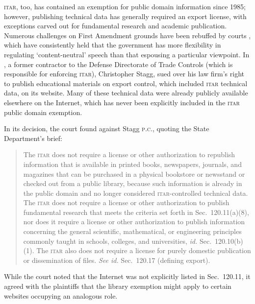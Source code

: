 \documentclass[12pt]{olfmemo}
\begin{document}
\textsc{itar}, too, has contained an exemption for public domain information since 1985; however, publishing technical data has generally required an export license, with exceptions carved out for fundamental research and academic publication. Numerous challenges on First Amendment grounds have been rebuffed by courts \citep{Edler1978,Posey1989,Mak2012,StaggPC2019}, which have consistently held that the government has more flexibility in regulating `content-neutral' speech than that espousing a particular viewpoint. In , a former contractor to the Defense Directorate of Trade Controls (which is responsible for enforcing \textsc{itar}), Christopher Stagg, sued over his law firm's right to publish educational materials on export control, which included \textsc{itar} technical data, on its website. Many of these technical data were already publicly available elsewhere on the Internet, which has never been explicitly included in the \textsc{itar} public domain exemption.

In its decision, the court found against Stagg \textsc{p.c.}, quoting the State Department's brief:
\begin{quote}
The \textsc{itar} does not require a license or other authorization to republish information that is available in printed books, newspapers, journals, and magazines that can be purchased in a physical bookstore or newsstand or checked out from a public library, because such information is already in the public domain and no longer considered \textsc{itar}-controlled technical data. The \textsc{itar} does not require a license or other authorization to publish fundamental research that meets the criteria set forth in Sec.~120.11(a)(8), nor does it require a license or other authorization to publish information concerning the general scientific, mathematical, or engineering principles commonly taught in schools, colleges, and universities, \textit{id.} Sec.~120.10(b)(1). The \textsc{itar} also does not require a license for purely domestic publication or dissemination of files. \textit{See id.} Sec.~120.17 (defining export). \citep{StaggPC2019}
\end{quote}
While the court noted that the Internet was not explicitly listed in Sec.~120.11, it agreed with the plaintiffs that the library exemption might apply to certain websites occupying an analogous role.
\end{document}
